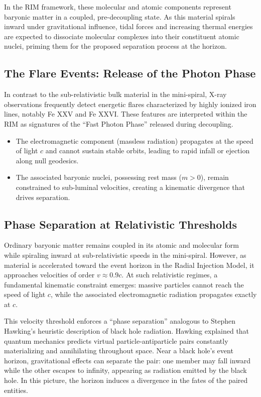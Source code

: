 \documentclass[12pt]{article}
\begin{document}
In the RIM framework, these molecular and atomic components represent baryonic matter in a coupled, pre-decoupling state. As this material spirals inward under gravitational influence, tidal forces and increasing thermal energies are expected to dissociate molecular complexes into their constituent atomic nuclei, priming them for the proposed separation process at the horizon.

\subsection{The Flare Events: Release of the Photon Phase}

In contrast to the sub-relativistic bulk material in the mini-spiral, X-ray observations frequently detect energetic flares characterized by highly ionized iron lines, notably Fe XXV and Fe XXVI. These features are interpreted within the RIM as signatures of the ``Fast Photon Phase'' released during decoupling.

\begin{itemize}
    \item The electromagnetic component (massless radiation) propagates at the speed of light $c$ and cannot sustain stable orbits, leading to rapid infall or ejection along null geodesics.
    \item The associated baryonic nuclei, possessing rest mass ($m > 0$), remain constrained to sub-luminal velocities, creating a kinematic divergence that drives  separation.
\end{itemize}

\subsection{Phase Separation at Relativistic Thresholds}

Ordinary baryonic matter remains coupled in its atomic and molecular form while spiraling inward at sub-relativistic speeds in the mini-spiral. However, as material is accelerated toward the event horizon in the Radial Injection Model, it approaches velocities of order $v \approx 0.9c$. At such relativistic regimes, a fundamental kinematic constraint emerges: massive particles cannot reach the speed of light $c$, while the associated electromagnetic radiation propagates exactly at $c$.

This velocity threshold enforces a ``phase separation'' analogous to Stephen Hawking's heuristic description of black hole radiation. Hawking explained that quantum mechanics predicts virtual particle-antiparticle pairs constantly materializing and annihilating throughout space. Near a black hole's event horizon, gravitational effects can separate the pair: one member may fall inward while the other escapes to infinity, appearing as radiation emitted by the black hole. In this picture, the horizon induces a divergence in the fates of the paired entities.
\end{document}
